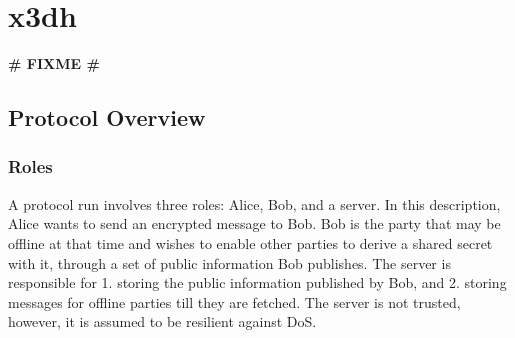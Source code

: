 \chapter{\acrfull*{x3dh}}
\textbf{\LARGE \# FIXME \#}
\label{ch:x3dh}

\section{Protocol Overview}
\subsection{Roles}
A protocol run involves three roles: Alice, Bob, and a server. In this description, Alice wants to send an encrypted message to Bob. Bob is the party that may be offline at that time and wishes to enable other parties to derive a shared secret with it, through a set of public information Bob publishes. The server is responsible for 1. storing the public information published by Bob, and 2. storing messages for offline parties till they are fetched. The server is not trusted, however, it is assumed to be resilient against DoS. %

